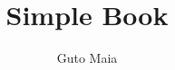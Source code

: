 \documentclass[a4paper]{book}
\begin{document}
\title{Simple Book}
\author{Guto Maia}
\frontmatter
\maketitle
\tableofcontents
\mainmatter


\end{document}
